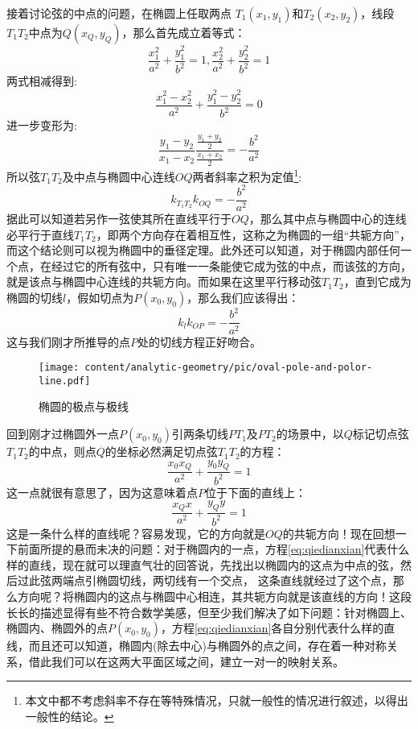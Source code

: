 接着讨论弦的中点的问题，在椭圆上任取两点 $T_1(x_1,y_1)$和$T_2(x_2,y_2)$，线段$T_1T_2$中点为$Q(x_Q,y_Q)$，那么首先成立着等式：
\begin{equation}
\frac{x_1^2}{a^2}+\frac{y_1^2}{b^2}=1, \frac{x_2^2}{a^2}+\frac{y_2^2}{b^2}=1
\end{equation}
两式相减得到:
\begin{equation}
\frac{x_1^2-x_2^2}{a^2}+\frac{y_1^2-y_2^2}{b^2}=0
\end{equation}
进一步变形为:
\begin{equation}
\frac{y_1-y_2}{x_1-x_2}\frac{\frac{y_1+y_2}{2}}{\frac{x_1+x_2}{2}}=-\frac{b^2}{a^2}
\end{equation}
所以弦$T_1T_2$及中点与椭圆中心连线$OQ$两者斜率之积为定值\footnote{本文中都不考虑斜率不存在等特殊情况，只就一般性的情况进行叙述，以得出一般性的结论。}:
\begin{equation}
k_{T_1T_2}k_{OQ}=-\frac{b^2}{a^2}
\end{equation}
据此可以知道若另作一弦使其所在直线平行于$OQ$，那么其中点与椭圆中心的连线必平行于直线$T_1T_2$，即两个方向存在着相互性，这称之为椭圆的一组“共轭方向”，而这个结论则可以视为椭圆中的垂径定理。此外还可以知道，对于椭圆内部任何一个点，在经过它的所有弦中，只有唯一一条能使它成为弦的中点，而该弦的方向，就是该点与椭圆中心连线的共轭方向。而如果在这里平行移动弦$T_1T_2$，直到它成为椭圆的切线$l$，假如切点为$P(x_0,y_0)$，那么我们应该得出：
\begin{equation}
k_l k_{OP}=-\frac{b^2}{a^2}
\end{equation}
这与我们刚才所推导的点$P$处的切线方程正好吻合。


\begin{figure}[htbp]
  \centering
\texttt{[image: content/analytic-geometry/pic/oval-pole-and-polor-line.pdf]}
\caption{椭圆的极点与极线}
\label{fig:oval-pole-and-polor-line}
\end{figure}

回到刚才过椭圆外一点$P(x_0,y_0)$引两条切线$PT_1$及$PT_2$的场景中，以$Q$标记切点弦$T_1T_2$的中点，则点$Q$的坐标必然满足切点弦$T_1T_2$的方程：
\begin{equation}
\frac{x_0 x_Q}{a^2}+\frac{y_0 y_Q}{b^2} = 1 \label{eq:pq}
\end{equation}
这一点就很有意思了，因为这意味着点$P$位于下面的直线上：
\begin{equation}
\frac{x_Q x}{a^2}+\frac{y_Q y}{b^2} = 1 \label{abc}
\end{equation}
这是一条什么样的直线呢？容易发现，它的方向就是$OQ$的共轭方向！现在回想一下前面所提的悬而未决的问题：对于椭圆内的一点，方程\ref{eq:qiedianxian}代表什么样的直线，现在就可以理直气壮的回答说，先找出以椭圆内的这点为中点的弦，然后过此弦两端点引椭圆切线，两切线有一个交点，
这条直线就经过了这个点，那么方向呢？将椭圆内的这点与椭圆中心相连，其共轭方向就是该直线的方向！这段长长的描述显得有些不符合数学美感，但至少我们解决了如下问题：针对椭圆上、椭圆内、椭圆外的点$P(x_0,y_0)$，方程\ref{eq:qiedianxian}各自分别代表什么样的直线，而且还可以知道，椭圆内(除去中心)与椭圆外的点之间，存在着一种对称关系，借此我们可以在这两大平面区域之间，建立一对一的映射关系。

